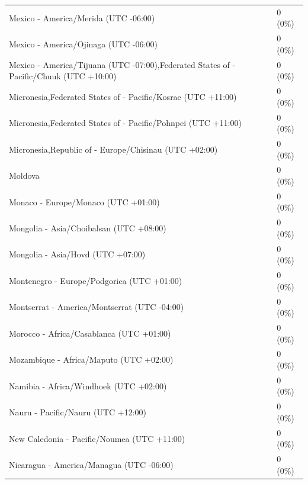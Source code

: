 \begin{appendix}
\begin{table}
{\begin{tabular}[t]{ll}
\hspace{1em}Mexico - America/Merida (UTC -06:00) & 0 (0\%)\\
\hspace{1em}Mexico - America/Ojinaga (UTC -06:00) & 0 (0\%)\\
\hspace{1em}Mexico - America/Tijuana (UTC -07:00),Federated States of - Pacific/Chuuk (UTC +10:00) & 0 (0\%)\\
\addlinespace
\hspace{1em}Micronesia,Federated States of - Pacific/Kosrae (UTC +11:00) & 0 (0\%)\\
\hspace{1em}Micronesia,Federated States of - Pacific/Pohnpei (UTC +11:00) & 0 (0\%)\\
\hspace{1em}Micronesia,Republic of - Europe/Chisinau (UTC +02:00) & 0 (0\%)\\
\hspace{1em}Moldova & 0 (0\%)\\
\hspace{1em}Monaco - Europe/Monaco (UTC +01:00) & 0 (0\%)\\
\addlinespace
\hspace{1em}Mongolia - Asia/Choibalsan (UTC +08:00) & 0 (0\%)\\
\hspace{1em}Mongolia - Asia/Hovd (UTC +07:00) & 0 (0\%)\\
\hspace{1em}Montenegro - Europe/Podgorica (UTC +01:00) & 0 (0\%)\\
\hspace{1em}Montserrat - America/Montserrat (UTC -04:00) & 0 (0\%)\\
\hspace{1em}Morocco - Africa/Casablanca (UTC +01:00) & 0 (0\%)\\
\addlinespace
\hspace{1em}Mozambique - Africa/Maputo (UTC +02:00) & 0 (0\%)\\
\hspace{1em}Namibia - Africa/Windhoek (UTC +02:00) & 0 (0\%)\\
\hspace{1em}Nauru - Pacific/Nauru (UTC +12:00) & 0 (0\%)\\
\hspace{1em}New Caledonia - Pacific/Noumea (UTC +11:00) & 0 (0\%)\\
\hspace{1em}Nicaragua - America/Managua (UTC -06:00) & 0 (0\%)\\

\end{tabular}}
\end{table}
\end{appendix}
